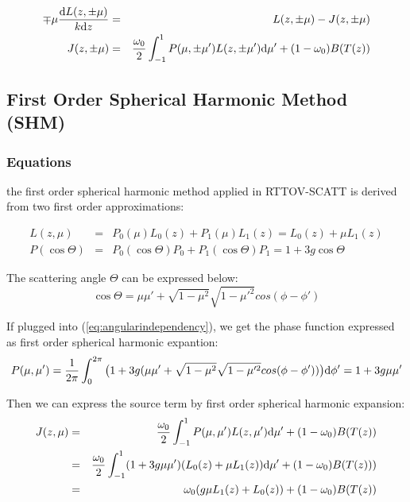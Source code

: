 \begin{eqnarray} \label{eq:firstprincipal2}
\mp\mu \frac{\mathrm{d} L(z, \pm\mu)}{k \mathrm{d} z} & = & 
L(z, \pm\mu) - J(z, \pm\mu) \nonumber\\
J(z, \pm\mu) & = &
\frac{\omega_{0}}{2}\int_{-1}^{1}
P(\mu, \pm\mu')L(z,\pm\mu')\mathrm{d}\mu'
+ (1-\omega_{0})B(T(z))
\end{eqnarray}

\subsection{First Order Spherical Harmonic Method (SHM)}
\subsubsection{Equations}
the first order spherical harmonic method applied in RTTOV-SCATT
is derived from two first order approximations:

\begin{eqnarray} \label{eq:SHMapprox}
L(z,\mu) & = & P_{0}(\mu)L_{0}(z) + P_{1}(\mu)L_{1}(z) 
 =  L_{0}(z) + \mu L_{1}(z) \nonumber\\
P(\cos\Theta) & = & P_{0}(\cos\Theta)P_{0} + P_{1}(\cos\Theta)P_{1}
 =  1 + 3g\cos\Theta
\end{eqnarray}

The scattering angle $\Theta$ can be expressed below:
\begin{displaymath}
    \cos\Theta = \mu\mu' + \sqrt{1-\mu^{2}}\sqrt{1-\mu'^{2}}cos(\phi - \phi')
\end{displaymath}

If plugged into (\ref{eq:angularindependency}), we get the phase function expressed
as first order spherical harmonic expantion:
\begin{equation} \label{eq:pmumup}
    P(\mu,\mu') = \frac{1}{2\pi}\int_{0}^{2\pi}
    \big(
        1 + 3g(\mu\mu' + \sqrt{1-\mu^{2}}\sqrt{1-\mu'^{2}}cos(\phi - \phi'))
    \big)
        \mathrm{d}\phi'
    = 1 + 3g\mu\mu'
\end{equation}

Then we can express the source term by first order spherical harmonic expansion:
\begin{eqnarray}
J(z,\mu) & = & \frac{\omega_{0}}{2}
\int_{-1}^{1}P(\mu, \mu')L(z, \mu')\mathrm{d}\mu'
+ (1-\omega_{0})B(T(z))  \nonumber\\
{} & = &  \frac{\omega_{0}}{2}
\int_{-1}^{1}(1+3g\mu\mu')(L_{0}(z) + \mu L_{1}(z))\mathrm{d}\mu'
+ (1-\omega_{0})B(T(z)))  \nonumber\\
{} & = &  \omega_{0}(g \mu L_{1}(z) + L_{0}(z))
+ (1-\omega_{0})B(T(z))
\end{eqnarray}

